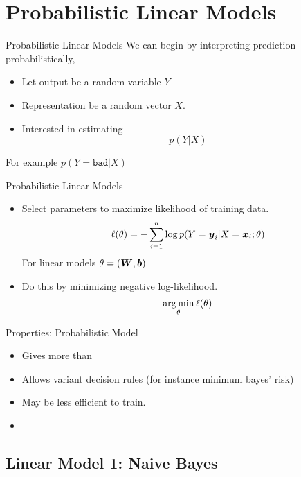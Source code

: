 \documentclass{beamer}
\begin{document}
\section{Probabilistic Linear Models}

\begin{frame}{Probabilistic Linear Models} 
  We can begin by interpreting prediction probabilistically,

  \begin{itemize}
  \item Let output be a random variable $Y$
  \item Representation be a random vector $X$. 
  \item Interested in estimating
    \[ p(Y | X) \] 
  \end{itemize}
  For example 
  $p(Y = \texttt{bad} | X)$ 
\end{frame}



\begin{frame}{Probabilistic Linear Models} 
  \begin{itemize}
  \item Select parameters to maximize likelihood of training data.
    \[ \ell(\theta) = - \sum_{i=1}^n \log p(Y = \boldsymbol{y}_i | X = \boldsymbol{x}_i; \theta) \] 
  For linear models $\theta = (\boldsymbol{W}, \boldsymbol{b})$ 

  \item Do this by minimizing negative log-likelihood.
    \[ \argmin_\theta \ell(\theta)\] 
  \end{itemize}

\end{frame}

\begin{frame}{Properties: Probabilistic Model}
  \begin{itemize}
  \item Gives more than 
  \item Allows variant decision rules (for instance minimum bayes' risk)
  \end{itemize}
  
  \begin{itemize}
  \item May be less efficient to train. 
  \item 
  \end{itemize}
\end{frame}



\subsection{Linear Model 1: Naive Bayes}
\end{document}
